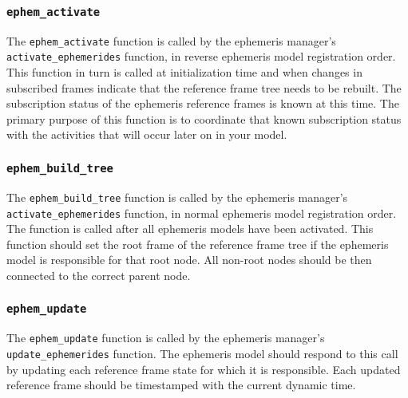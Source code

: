 \subsubsection{\texttt{ephem\_activate}}
The \texttt{ephem\_activate} function is called by the
ephemeris manager's \texttt{activate\_ephemerides} function,
in reverse ephemeris model registration order.
This function in turn is called at initialization time and
when changes in subscribed frames indicate that the reference
frame tree needs to be rebuilt. The subscription status of the
ephemeris reference frames is known at this time. The primary
purpose of this function is to coordinate that known subscription status
with the activities that will occur later on in your model.

\subsubsection{\texttt{ephem\_build\_tree}}
The \texttt{ephem\_build\_tree} function is called by the
ephemeris manager's \texttt{activate\_ephemerides} function,
in normal ephemeris model registration order.
The function is called after all ephemeris models have been
activated.
This function should set the root frame of the reference frame tree
if the ephemeris model is responsible for that root node. All
non-root nodes should be then connected to the correct parent node.

\subsubsection{\texttt{ephem\_update}}
The \texttt{ephem\_update} function is called by the
ephemeris manager's \texttt{update\_ephemerides} function.
The ephemeris model should respond to this call by updating
each reference frame state for which it is responsible.
Each updated reference frame should be timestamped with the current
dynamic time.

